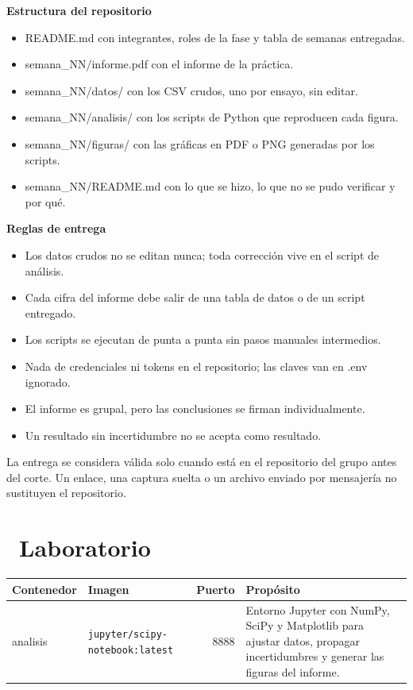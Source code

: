 \documentclass[11pt,a4paper]{article}
\newcommand{\iconotexto}[2]{\textcolor{cyanNeon}{\faIcon{#1}}~#2}
\begin{document}
\textbf{Estructura del repositorio}

\begin{itemize}[leftmargin=1.4em,itemsep=2pt,topsep=3pt]
  \item README.md con integrantes, roles de la fase y tabla de semanas entregadas.
  \item semana\_NN/informe.pdf con el informe de la práctica.
  \item semana\_NN/datos/ con los CSV crudos, uno por ensayo, sin editar.
  \item semana\_NN/analisis/ con los scripts de Python que reproducen cada figura.
  \item semana\_NN/figuras/ con las gráficas en PDF o PNG generadas por los scripts.
  \item semana\_NN/README.md con lo que se hizo, lo que no se pudo verificar y por qué.
\end{itemize}

\textbf{Reglas de entrega}

\begin{itemize}[leftmargin=1.4em,itemsep=2pt,topsep=3pt]
  \item Los datos crudos no se editan nunca; toda corrección vive en el script de análisis.
  \item Cada cifra del informe debe salir de una tabla de datos o de un script entregado.
  \item Los scripts se ejecutan de punta a punta sin pasos manuales intermedios.
  \item Nada de credenciales ni tokens en el repositorio; las claves van en .env ignorado.
  \item El informe es grupal, pero las conclusiones se firman individualmente.
  \item Un resultado sin incertidumbre no se acepta como resultado.
\end{itemize}

\begin{cajaRecuerda}La entrega se considera válida solo cuando está en el repositorio del grupo antes del corte. Un enlace, una captura suelta o un archivo enviado por mensajería no sustituyen el repositorio.\end{cajaRecuerda}

\section{\iconotexto{server}{Laboratorio}}

\begin{tabularx}{\linewidth}{@{}l l r X@{}}
\toprule
Contenedor & Imagen & Puerto & Propósito\\
\midrule
analisis & \texttt{jupyter/scipy-notebook:latest} & 8888 & Entorno Jupyter con NumPy, SciPy y Matplotlib para ajustar datos, propagar incertidumbres y generar las figuras del informe. \\
\bottomrule
\end{tabularx}
\end{document}
